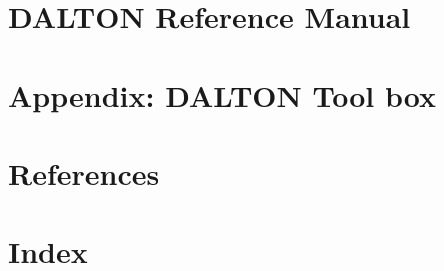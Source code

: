 \documentclass[11pt]{report}
\begin{document}
\part{DALTON Reference Manual}






















%







\part{Appendix: DALTON Tool box}

\part{References}


%
\part{Index}
\printindex
\end{document}
